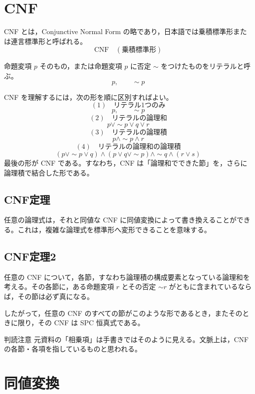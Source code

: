 \documentclass[../main.tex]{subfiles}
\begin{document}
\section{CNF}

CNF とは，Conjunctive Normal Form の略であり，日本語では乗積標準形または連言標準形と呼ばれる。
\[
  \mathrm{CNF}
  \quad
  (\text{乗積標準形})
\]

命題変項 \(p\) そのもの，または命題変項 \(p\) に否定 \(\sim\) をつけたものをリテラルと呼ぶ。
\[
  p,
  \qquad
  \sim p
\]

CNF を理解するには，次の形を順に区別すればよい。
\[
  (1)\quad
  \text{リテラル1つのみ}
\]
\[
  p,
  \qquad
  \sim p
\]
\[
  (2)\quad
  \text{リテラルの論理和}
\]
\[
  p \lor \sim p \lor q \lor r
\]
\[
  (3)\quad
  \text{リテラルの論理積}
\]
\[
  p \land \sim p \land r
\]
\[
  (4)\quad
  \text{リテラルの論理和の論理積}
\]
\[
  (p \lor \sim p \lor q)
  \land
  (p \lor q \lor \sim p)
  \land
  \sim q
  \land
  (r \lor s)
\]
最後の形が CNF である。すなわち，CNF は「論理和でできた節」を，さらに論理積で結合した形である。

\subsection{CNF定理}

任意の論理式は，それと同値な CNF に同値変換によって書き換えることができる。これは，複雑な論理式を標準形へ変形できることを意味する。

\subsection{CNF定理2}

任意の CNF について，各節，すなわち論理積の構成要素となっている論理和を考える。その各節に，ある命題変項 \(r\) とその否定 \(\sim r\) がともに含まれているならば，その節は必ず真になる。

したがって，任意の CNF のすべての節がこのような形であるとき，またそのときに限り，その CNF は SPC 恒真式である。

\begin{sidebox}[TBred]{判読注意}
  元資料の「相乗項」は手書きではそのように見える。文脈上は，CNF の各節・各項を指しているものと思われる。
\end{sidebox}

\section{同値変換}
\end{document}
